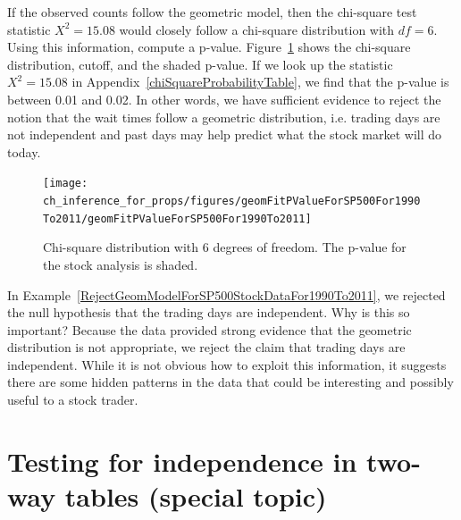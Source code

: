 \begin{example}{If the observed counts follow the geometric model, then the chi-square test statistic $X^2 = 15.08$ would closely follow a chi-square distribution with $df = 6$. Using this information, compute a p-value.} \label{RejectGeomModelForSP500StockDataFor1990To2011}
Figure~\ref{geomFitPValueForSP500For1990To2011} shows the chi-square distribution, cutoff, and the shaded p-value. If we look up the statistic $X^2=15.08$ in Appendix~\ref{chiSquareProbabilityTable}, we find that the p-value is between 0.01 and 0.02. In other words, we have sufficient evidence to reject the notion that the wait times follow a geometric distribution, i.e. trading days are not independent and past days may help predict what the stock market will do today.
\end{example}

\begin{figure}[h]
\centering
\texttt{[image: ch\_inference\_for\_props/figures/geomFitPValueForSP500For1990To2011/geomFitPValueForSP500For1990To2011]}
\caption{Chi-square distribution with 6 degrees of freedom. The p-value for the stock analysis is shaded.}
\label{geomFitPValueForSP500For1990To2011}
\end{figure}

\begin{example}{In Example~\ref{RejectGeomModelForSP500StockDataFor1990To2011}, we rejected the null hypothesis that the trading days are independent. Why is this so important?}
Because the data provided strong evidence that the geometric distribution is not appropriate, we reject the claim that trading days are independent. While it is not obvious how to exploit this information, it suggests there are some hidden patterns in the data that could be interesting and possibly useful to a stock trader.
\end{example}




\section%
{Testing for independence in two-way tables (special topic)}
\label{twoWayTablesAndChiSquare}


